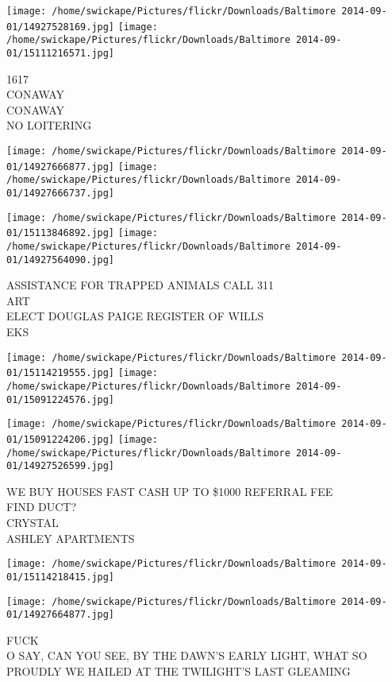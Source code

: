 \documentclass[10pt,letterpaper]{article}
\begin{document}
\texttt{[image: /home/swickape/Pictures/flickr/Downloads/Baltimore 2014-09-01/14927528169.jpg]}
\texttt{[image: /home/swickape/Pictures/flickr/Downloads/Baltimore 2014-09-01/15111216571.jpg]}

1617\\
CONAWAY\\
CONAWAY\\
NO LOITERING
\pagebreak

\texttt{[image: /home/swickape/Pictures/flickr/Downloads/Baltimore 2014-09-01/14927666877.jpg]}
\texttt{[image: /home/swickape/Pictures/flickr/Downloads/Baltimore 2014-09-01/14927666737.jpg]}

\texttt{[image: /home/swickape/Pictures/flickr/Downloads/Baltimore 2014-09-01/15113846892.jpg]}
\texttt{[image: /home/swickape/Pictures/flickr/Downloads/Baltimore 2014-09-01/14927564090.jpg]}

ASSISTANCE FOR TRAPPED ANIMALS CALL 311\\
ART\\
ELECT DOUGLAS PAIGE REGISTER OF WILLS\\
EKS
\pagebreak

\texttt{[image: /home/swickape/Pictures/flickr/Downloads/Baltimore 2014-09-01/15114219555.jpg]}
\texttt{[image: /home/swickape/Pictures/flickr/Downloads/Baltimore 2014-09-01/15091224576.jpg]}

\texttt{[image: /home/swickape/Pictures/flickr/Downloads/Baltimore 2014-09-01/15091224206.jpg]}
\texttt{[image: /home/swickape/Pictures/flickr/Downloads/Baltimore 2014-09-01/14927526599.jpg]}

WE BUY HOUSES FAST CASH UP TO \$1000 REFERRAL FEE\\
FIND DUCT?\\
CRYSTAL\\
ASHLEY APARTMENTS
\pagebreak

\texttt{[image: /home/swickape/Pictures/flickr/Downloads/Baltimore 2014-09-01/15114218415.jpg]}

\vspace{0.25in}
\texttt{[image: /home/swickape/Pictures/flickr/Downloads/Baltimore 2014-09-01/14927664877.jpg]}

FUCK\\
O SAY, CAN YOU SEE, BY THE DAWN'S EARLY LIGHT, WHAT SO PROUDLY WE HAILED AT THE TWILIGHT'S LAST GLEAMING
\pagebreak
\end{document}
